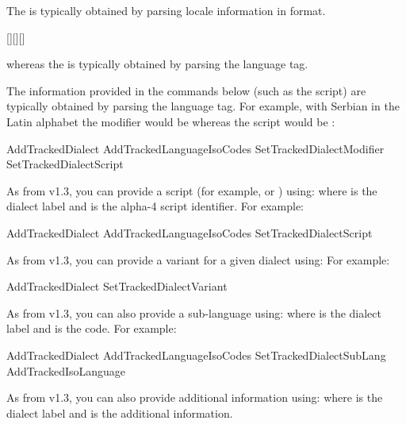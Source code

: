 \documentclass[titlepage=false,oneside,
 fontsize=12pt,captions=tableheading]{scrbook}
\begin{document}
The  is typically obtained by parsing locale information in
 format.
\begin{compactcodebox*}
[][][]
\end{compactcodebox*}
whereas the  is typically obtained by parsing the language
tag.

The information provided in the commands below (such as the script)
are typically obtained by parsing the language tag. For example,
with Serbian in the Latin alphabet the modifier would be 
whereas the script would be :
\begin{codebox*}
\gls{AddTrackedDialect}
\gls{AddTrackedLanguageIsoCodes}
\gls{SetTrackedDialectModifier}
\gls{SetTrackedDialectScript}
\end{codebox*}

As from v1.3, you can provide a script (for example,
 or ) using:
where  is the dialect label and  is the
 alpha-4 script identifier. For example:
\begin{codebox*}
\gls{AddTrackedDialect}
\gls{AddTrackedLanguageIsoCodes}
\gls{SetTrackedDialectScript}
\end{codebox*}

As from v1.3, you can provide a variant for a given
dialect using:
For example:
\begin{codebox*}
\gls{AddTrackedDialect}
\gls{SetTrackedDialectVariant}
\end{codebox*}

As from v1.3, you can also provide a sub-language using:
where  is the dialect label and  is the
code. For example:
\begin{codebox*}
\gls{AddTrackedDialect}
\gls{AddTrackedLanguageIsoCodes}
\gls{SetTrackedDialectSubLang}
\gls{AddTrackedIsoLanguage}
\end{codebox*}

As from v1.3, you can also provide additional information using:
where  is the dialect label and  is the
additional information.
\end{document}
